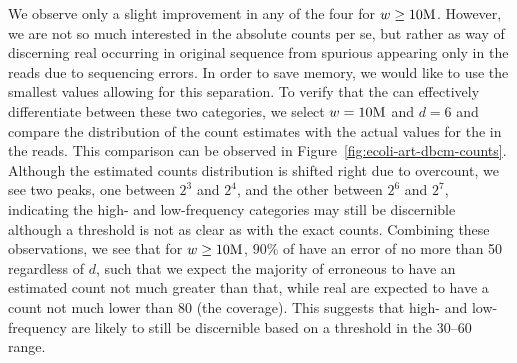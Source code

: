 We observe only a slight improvement in any of the four for $w\geq 10\mega$. However, we are not so much interested in the absolute counts per se, but rather as way of discerning real \kmers occurring in original sequence from spurious \kmers appearing only in the reads due to sequencing errors. In order to save memory, we would like to use the smallest values allowing for this separation.
To verify that the \dBCM can effectively differentiate between these two categories, we select $w=10\mega$ and $d=6$ and compare the distribution of the count estimates with the actual values for the  in the reads. This comparison can be observed in Figure~\ref{fig:ecoli-art-dbcm-counts}.   Although the estimated counts distribution is shifted right due to overcount, we see two peaks, one between $2^3$ and $2^4$, and the other between $2^6$ and $2^7$, indicating the high- and low-frequency categories may still be discernible although a threshold is not as clear as with the exact counts.
Combining these observations, we see that for $w \geq 10\mega$, $90\%$ of  have an error of no more than 50 regardless of $d$, such that we expect the majority of erroneous  to have an estimated count not much greater than that, while real  are expected to have a count not much lower than $80$ (the coverage). This suggests that high- and low-frequency  are likely to still be discernible based on a threshold in the 30--60 range.


